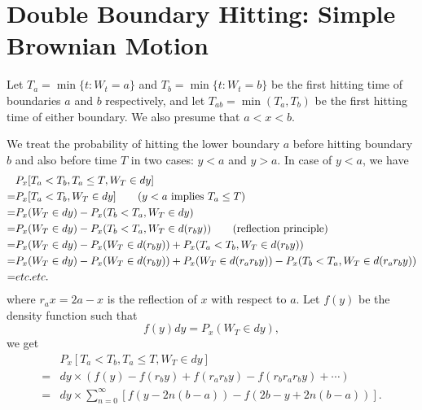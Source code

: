\section{Double Boundary Hitting: Simple Brownian Motion}
Let $T_a=\min \{t:W_t=a \}$ and $T_b=\min \{t:W_t=b \}$ be the first hitting
time of boundaries $a$ and $b$ respectively, and let $T_{ab}=\min(T_a,T_b)$ be
the first hitting time of either boundary.
We also presume that $a<x<b$.

We treat the probability of hitting the lower boundary $a$ before hitting
boundary $b$ and also before time $T$ in two cases: $y<a$ and $y>a$.
In case of $y<a$, we have
\begin{align*}
	&P_x[T_a<T_b, T_a\le T, W_T\in dy]  \notag \\
	=&  P_x[T_a<T_b, W_T\in dy]   \qquad \text{($y<a$ implies $T_a\le T$)}
	    \notag \\
  =& P_x(W_T\in dy) - P_x(T_b<T_a, W_T\in dy)   \notag \\
	=& P_x(W_T\in dy) - P_x(T_b<T_a, W_T\in d(r_b y)) 
			\qquad \text{(reflection principle)}  \notag \\
	=& P_x(W_T\in dy) - P_x(W_T\in d(r_b y)) + P_x(T_a<T_b, W_T\in d(r_b y))
			\notag \\
	=& P_x(W_T\in dy) - P_x(W_T\in d(r_b y)) + P_x(W_T\in d(r_a r_b y))  
			- P_x(T_b<T_a, W_T\in d(r_a r_b y)) \notag \\
  =& etc.etc.   \notag \\
\end{align*}
where $r_a x = 2a-x$ is the reflection of $x$ with respect to $a$.
Let $f(y)$ be the density function such that
\begin{equation}
	f(y) dy = P_x(W_T\in dy), 
\end{equation}
we get
\begin{align*}
	 & P_x[T_a<T_b, T_a\le T, W_T\in dy]   \\
  =& dy\times (f(y) - f(r_b y) + f(r_a r_b y) - f(r_b r_a r_b y)
		 + \cdots) \\
	=& dy\times\sum_{n=0}^{\infty} [ f(y-2n(b-a)) - f(2b-y+2n(b-a)) ].
\end{align*}


